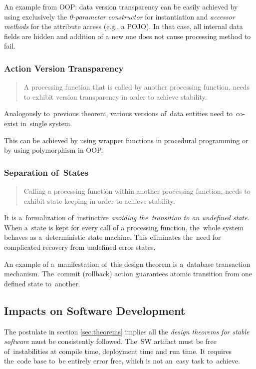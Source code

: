 \documentclass[thesis=M,english,hidelinks]{FITthesis}[2012/10/20]
\begin{document}
An example from \acrshort{OOP}: data version transparency can be easily achieved by using exclusively the \textit{0-parameter constructor} for instantiation and \emph{accessor methods} for the attribute access (e.g., a \acrshort{POJO}). In that case, all internal data fields are hidden and addition of a new one does not cause processing method to fail.

\subsubsection{Action Version Transparency}
\begin{quote}
A processing function that is called by another processing function, needs to exhibit version transparency in order to achieve stability.~\cite{ns-toward-general-theory}
\end{quote}

Analogously to~previous theorem, various versions of~data entities need to~co-exist in~single system.

This can be achieved by using wrapper functions in procedural programming or by using polymorphism in \acrshort{OOP}.

\subsubsection{Separation of~States}
\begin{quote}
Calling a processing function within another processing function, needs to exhibit state keeping in order to achieve stability.~\cite{ns-toward-general-theory}
\end{quote}

It is a~formalization of~instinctive \emph{avoiding the~transition to an undefined state}. When a~state is kept for every call of a processing function, the~whole system behaves as a~deterministic state machine. This eliminates the~need for complicated recovery from undefined error states.

An example of a~manifestation of~this design theorem is a~database transaction mechanism. The~commit (rollback) action guarantees atomic transition from one defined state to~another.

\subsection{Impacts on Software Development}
The postulate in section \ref{sec:theorems} implies all the \textit{design theorems for stable software} must be consistently followed. The~\acrshort{SW} artifact must be free of~instabilities at compile time, deployment time and run time. It requires the~code base to~be entirely error free, which is not an~easy task to~achieve.
\end{document}
